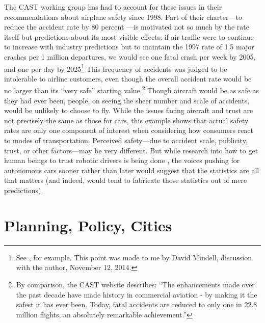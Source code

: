 The CAST working group has had to account for these issues in their
recommendations about airplane safety since 1998. Part of their charter---to
reduce the accident rate by 80 percent \cite[p. 28]{PARCCAST}---is
motivated not so much by the rate itself but predictions about its
most visible effects:  if air traffic were to continue to increase
with industry predictions but to maintain the 1997 rate of 1.5 major
crashes per 1 million departures, we would see one fatal crash per
week by 2005, and one per day by 2025\footnote{See
  \cite{predictmorecrashes},
  for example. This point was made to me by David Mindell, discussion
  with the author, November 12, 2014.}
This frequency of accidents was judged to be intolerable to
airline customers, even though the overall accident rate would be no
larger than its ``very safe'' \cite[p. 129]{PARCCAST} starting
value.\footnote{By comparison, the CAST website describes: ``The
  enhancements made over the past decade have made history in
  commercial aviation - by making it the safest it has ever been.
  Today, fatal accidents are reduced to only one in 22.8 million
  flights, an absolutely remarkable achievement.''\cite{cast-safety.org}} Though
aircraft would be as safe as they 
had ever been, people, on seeing the sheer number and scale of
accidents, would be unlikely to choose to fly. While the issues facing
aircraft and trust are not precisely the same as those for cars, this
example shows that actual safety rates are only
one component of interest when considering how consumers react to
modes of transportation. Perceived safety---due to accident scale,
publicity, trust, or other factors---may be very different. But
while research into how to get human beings to trust robotic drivers
is being done \cite{rossTrust}, the voices pushing for autonomous cars sooner
rather than later would suggest that the statistics are all that
matters (and indeed, would tend to fabricate those statistics out of
mere predictions). 


\section{Planning, Policy, Cities}

